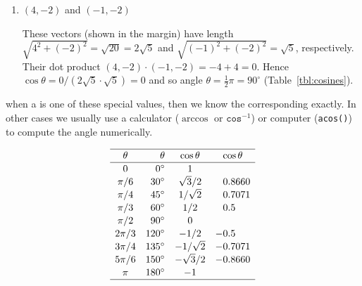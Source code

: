 \begin{example}
\begin{enumerate}
\item \((4,-2)\) and \((-1,-2)\)
\begin{solution} 
These vectors (shown in the margin) have length \(\sqrt{4^2+(-2)^2}=\sqrt{20}=2\sqrt5\) and \(\sqrt{(-1)^2+(-2)^2}=\sqrt{5}\), respectively.
Their dot product  \((4,-2)\cdot(-1,-2)=-4+4=0\).
Hence \(\cos\theta =0/(2\sqrt{5}\cdot\sqrt5) =0\) and so angle \(\theta=\frac12\pi=90^\circ\) (Table~\ref{tbl:cosines}).
%
\end{solution}

\end{enumerate}
\end{example}





\begin{table}
\caption{when a  is one of these special values, then we know the corresponding  exactly.  
In other cases we usually use a calculator (\(\arccos\) or \(\texttt{cos}^{-1}\)) or computer (\texttt{acos()}) to compute the angle numerically.}
\label{tbl:cosines}
\begin{equation*}\def\arraystretch{1.1}
\begin{array}{crcr@.l}
\hline
\theta&\theta&\cos\theta&\multicolumn2c{\cos\theta}
\\\hline
0&0^\circ&1
\\\pi/6&30^\circ&{\sqrt3}/2&0&8660
\\\pi/4&45^\circ&1/{\sqrt2}&0&7071
\\\pi/3&60^\circ&1/2&0&5
\\\pi/2&90^\circ&0
\\{2\pi}/3&120^\circ&-1/2&-0&5
\\{3\pi}/4&135^\circ&-1/{\sqrt2}&-0&7071
\\{5\pi}/6&150^\circ&-{\sqrt3}/2&-0&8660
\\\pi&180^\circ&-1
\\\hline
\end{array}
\end{equation*}
\end{table}




